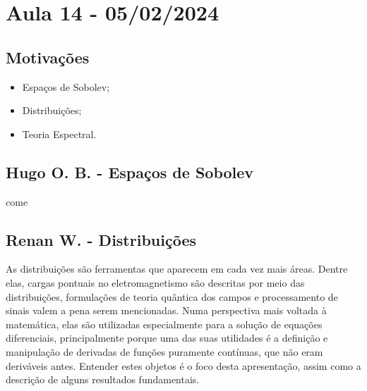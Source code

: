 \documentclass[measure_theory.tex]{subfiles}
\begin{document}
\section{Aula 14 - 05/02/2024}
\subsection{Motivações}
\begin{itemize}
	\item Espaços de Sobolev;
	\item Distribuições;
	\item Teoria Espectral.
\end{itemize}
\subsection{Hugo O. B. - Espaços de Sobolev}
  come
\subsection{Renan W. - Distribuições}
As distribuições são ferramentas que aparecem em cada vez mais áreas. Dentre elas, cargas pontuais no eletromagnetismo são descritas por meio das distribuições,
formulações de teoria quântica dos campos e processamento de sinais valem a pena serem mencionadas. Numa perspectiva mais voltada à matemática, elas são utilizadas especialmente
para a solução de equações diferenciais, principalmente porque uma das suas utilidades é a definição e manipulação de derivadas de funções puramente contínuas, que não eram deriváveis antes.
Entender estes objetos é o foco desta apresentação, assim como a descrição de alguns resultados fundamentais.
\end{document}
